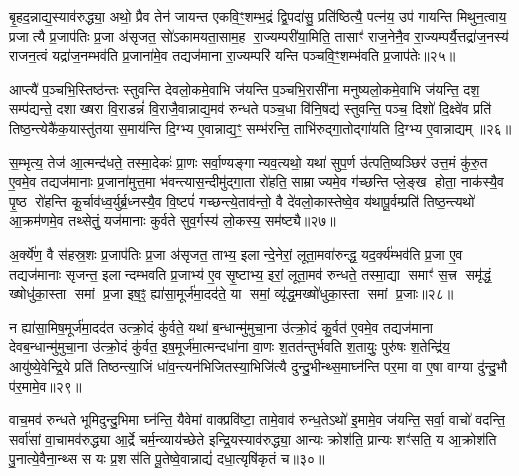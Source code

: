 बृ॒हद॒न्नाद्य॒स्याव॑रुद्ध्या॒ अथो॒ प्रैव तेन॑ जायन्त एकवि॒ꣳ॒शम्भ॒द्रं द्वि॒पदा॑सु॒ प्रति॑ष्ठित्यै॒ पत्न॑य॒ उप॑ गायन्ति मिथुन॒त्वाय॒ प्रजात्यै प्र॒जाप॑तिः प्र॒जा अ॑सृजत॒ सो॑ऽकामयता॒साम॒ह रा॒ज्यम्परी॑या॒मिति॒ तासाꣳ॑ राज॒नेनै॒व रा॒ज्यम्पर्यै॒त्तद्रा॑ज॒नस्य॑ राजन॒त्वं यद्रा॑ज॒नम्भव॑ति प्र॒जाना॑मे॒व तद्यज॑माना रा॒ज्यम्परि॑ यन्ति पञ्चवि॒ꣳ॒शम्भ॑वति प्र॒जाप॑तेः॥२५॥

आप्त्यै॑ प॒ञ्चभि॒स्तिष्ठ॑न्तः स्तुवन्ति देवलो॒कमे॒वाभि ज॑यन्ति प॒ञ्चभि॒रासी॑ना मनुष्यलो॒कमे॒वाभि ज॑यन्ति॒ दश॒ सम्प॑द्यन्ते॒ दशाख्षरा वि॒राडन्नं॑ वि॒राजै॒वान्नाद्य॒मव॑ रुन्धते पञ्च॒धा वि॑नि॒षद्य॑ स्तुवन्ति॒ पञ्च॒ दिशो॑ दि॒क्ष्वे॑व प्रति॑ तिष्ठ॒न्त्येकै॑क॒यास्तु॑तया स॒माय॑न्ति दि॒ग्भ्य ए॒वान्नाद्य॒ꣳ॒ सम्भ॑रन्ति॒ ताभि॑रुद्गा॒तोद्गा॑यति दि॒ग्भ्य ए॒वान्नाद्यम्॥२६॥

स॒म्भृत्य॒ तेज॑ आ॒त्मन्द॑धते॒ तस्मा॒देकः॑ प्रा॒णः सर्वा॒ण्यङ्गान्यव॒त्यथो॒ यथा॑ सुप॒र्ण उ॑त्पति॒ष्यञ्छिर॑ उत्त॒मं कु॑रु॒त ए॒वमे॒व तद्यज॑मानाः प्र॒जाना॑मुत्त॒मा भ॑वन्त्यास॒न्दीमु॑द्गा॒ता रो॑हति॒ साम्राज्यमे॒व ग॑च्छन्ति प्ले॒ङ्ख होता॒ नाक॑स्यै॒व पृ॒ष्ठ रो॑हन्ति कू॒र्चाव॑ध्व॒र्युर्ब्र॒ध्नस्यै॒व वि॒ष्टपं॑ गच्छन्त्ये॒ताव॑न्तो॒ वै दे॑वलो॒कास्तेष्वे॒व य॑थापू॒र्वम्प्रति॑ तिष्ठ॒न्त्यथो॑ आ॒क्रम॑णमे॒व तथ्सेतुं॒ यज॑मानाः कुर्वते सुव॒र्गस्य॑ लो॒कस्य॒ सम॑ष्ट्यै॥२७॥

{\anuvakamend[{सद॑सस्सप्तद॒शं प्र॒जाप॑तेर्गायति दि॒ग्भ्य ए॒वान्नाद्य॒म्प्रत्येका॑दश च॥८॥}]}

अ॒र्क्ये॑ण॒ वै स॑हस्र॒शः प्र॒जाप॑तिः प्र॒जा अ॑सृजत॒ ताभ्य॒ इलान्दे॒नेरां॒ लूता॒मवा॑रुन्द्ध॒ यद॒र्क्य॑म्भव॑ति प्र॒जा ए॒व तद्यज॑मानाः सृजन्त॒ इलान्दम्भवति प्र॒जाभ्य॑ ए॒व सृ॒ष्टाभ्य॒ इरां॒ लूता॒मव॑ रुन्धते॒ तस्मा॒द्या समाꣳ॑ स॒त्त्र समृ॑द्धं॒ ख्षोधु॑का॒स्ता समां प्र॒जा इष॒ꣵ॒ ह्या॑सा॒मूर्ज॑मा॒दद॑ते॒ या समां॒ व्यृ॑द्ध॒मख्षो॑धुका॒स्ता समां प्र॒जाः॥२८॥

न ह्या॑सा॒मिष॒मूर्ज॑मा॒दद॑त उत्क्रो॒दं कु॑र्वते॒ यथा॑ ब॒न्धान्मु॑मुचा॒ना उ॑त्क्रो॒दं कु॒र्वत॑ ए॒वमे॒व तद्यज॑माना देवब॒न्धान्मु॑मुचा॒ना उ॑त्क्रो॒दं कु॑र्वत॒ इष॒मूर्ज॑मा॒त्मन्दधा॑ना वा॒णः श॒तत॑न्तुर्भवति श॒तायुः॒ पुरु॑षः श॒तेन्द्रि॑य॒ आयु॑ष्ये॒वेन्द्रि॒ये प्रति॑ तिष्ठन्त्या॒जिं धा॑व॒न्त्यन॑भिजितस्या॒भिजि॑त्यै दुन्दु॒भीन्थ्स॒माघ्न॑न्ति पर॒मा वा ए॒षा वाग्या दु॑न्दु॒भौ प॑र॒मामे॒व॥२९॥

वाच॒मव॑ रुन्धते भूमिदुन्दु॒भिमा घ्न॑न्ति॒ यैवेमां वाक्प्रवि॑ष्टा॒ तामे॒वाव॑ रुन्ध॒तेऽथो॑ इ॒मामे॒व ज॑यन्ति॒ सर्वा॒ वाचो॑ वदन्ति॒ सर्वा॑सां वा॒चामव॑रुद्ध्या आ॒र्द्रे चर्म॒न्व्याय॑च्छेते इन्द्रि॒यस्याव॑रुद्ध्या॒ आन्यः क्रोश॑ति॒ प्रान्यः शꣳ॑सति॒ य आ॒क्रोश॑ति पु॒नात्ये॒वैना॒न्थ्स स यः प्र॒शस॑ति पू॒तेष्वे॒वान्नाद्यं॑ दधा॒त्यृषि॑कृतं च॥३०॥

